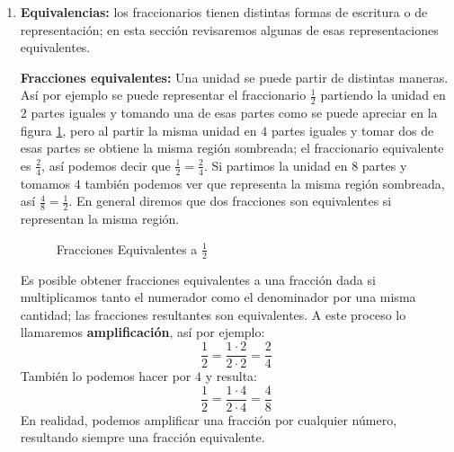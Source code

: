 \begin{enumerate}
    \item \textbf{Equivalencias:} los fraccionarios tienen distintas formas de escritura o de representación; en esta sección revisaremos algunas de esas representaciones equivalentes.

    \textbf{Fracciones equivalentes:} Una unidad se puede partir de distintas maneras. Así por ejemplo se puede representar el fraccionario $\frac{1}{2}$ partiendo la unidad en $2$ partes iguales y tomando una de esas partes como se puede apreciar en la figura \ref{fig:fraccion04}, pero al partir la misma unidad en $4$ partes iguales y tomar dos de esas partes se obtiene la misma región sombreada; el fraccionario equivalente es $\frac{2}{4}$, así podemos decir que $\frac{1}{2}=\frac{2}{4}$. Si partimos la unidad en $8$ partes y tomamos $4$ también podemos ver que representa la misma región sombreada, así $\frac{4}{8}=\frac{1}{2}$. En general diremos que dos fracciones son equivalentes si representan la misma región.

    \begin{figure}[ht]
    \caption{Fracciones Equivalentes a $\frac{1}{2}$}\label{fig:fraccion04}
    \centering
    \end{figure}

    Es posible obtener fracciones equivalentes a una fracción dada si multiplicamos tanto el numerador como el denominador por una misma cantidad; las fracciones resultantes son equivalentes. A este proceso lo llamaremos \textbf{amplificación}, así por ejemplo: 
    \[ \frac{1}{2}=\frac{1\cdot 2}{2\cdot 2}=\frac{2}{4} \] 
    También lo podemos hacer por $4$ y resulta:
    \[ \frac{1}{2}=\frac{1\cdot 4}{2\cdot 4}=\frac{4}{8} \] 
    En realidad, podemos amplificar una fracción por cualquier número, resultando siempre una fracción equivalente.


\end{enumerate}
